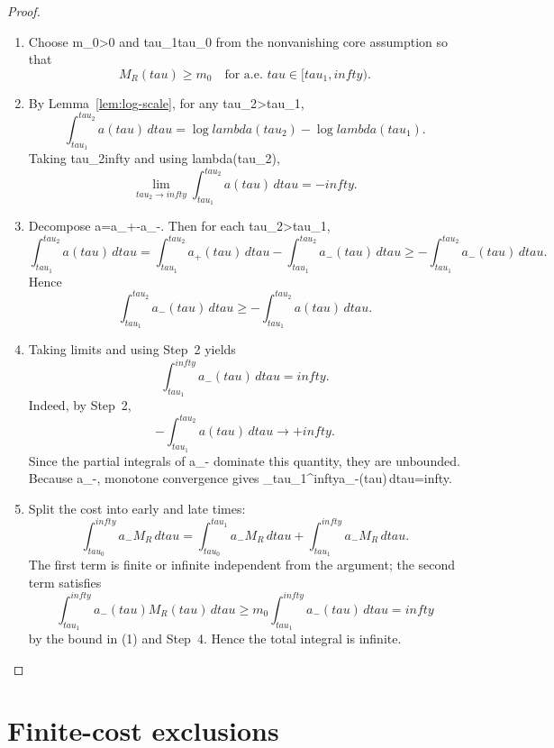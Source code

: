 \documentclass[11pt]{amsart}
\def\({}%
\def\){}%
\def\tau{tau}%
\def\lambda{lambda}%
\def\infty{infty}%
\theoremstyle{plain}
\theoremstyle{definition}
\theoremstyle{remark}
\begin{document}
\begin{proof}
\begin{enumerate}[label=(\arabic*)]
  \item Choose \(m_0>0\) and \(\tau_1\ge\tau_0\) from the nonvanishing
  core assumption so that
  \[
    M_R(\tau)\ge m_0\quad\text{for a.e. }\tau\in[\tau_1,\infty).
  \]

  \item By Lemma~\ref{lem:log-scale}, for any \(\tau_2>\tau_1\),
  \[
    \int_{\tau_1}^{\tau_2}a(\tau)
    \,d\tau
    =\log\lambda(\tau_2)-\log\lambda(\tau_1).
  \]
  Taking \(\tau_2\to\infty\) and using \(\lambda(\tau_2)\),
  \[
    \lim_{\tau_2\to\infty}\int_{\tau_1}^{\tau_2}a(\tau)
    \,d\tau=-\infty.
  \]

  \item Decompose \(a=a_+-a_-\).  Then for each \(\tau_2>\tau_1\),
  \[
    \int_{\tau_1}^{\tau_2}a(\tau)
    \,d\tau
    =\int_{\tau_1}^{\tau_2}a_+(\tau)
    \,d\tau-\int_{\tau_1}^{\tau_2}a_-(\tau)
    \,d\tau
    \ge-\int_{\tau_1}^{\tau_2}a_-(\tau)
    \,d\tau.
    \]
    Hence
    \[
    \int_{\tau_1}^{\tau_2}a_-(\tau)
    \,d\tau\ge
    -\int_{\tau_1}^{\tau_2}a(\tau)
    \,d\tau.
    \]

  \item Taking limits and using Step~2 yields
  \[
    \int_{\tau_1}^{\infty}a_-(\tau)
    \,d\tau=\infty.
  \]
  Indeed, by Step~2,
  \[
    -\int_{\tau_1}^{\tau_2}a(\tau)\,d\tau\to+\infty.
  \]
  Since the partial integrals of \(a_-\) dominate this quantity, they are unbounded.
  Because \(a_-\), monotone convergence gives
  \(\int_{\tau_1}^{\infty}a_-(\tau)\,d\tau=\infty\).

  \item Split the cost into early and late times:
  \[
    \int_{\tau_0}^{\infty}a_-M_R
    \,d\tau
    =\int_{\tau_0}^{\tau_1}a_-M_R
    \,d\tau+
    \int_{\tau_1}^{\infty}a_-M_R
    \,d\tau.
  \]
  The first term is finite or infinite independent from the argument; the second term
  satisfies
  \[
    \int_{\tau_1}^{\infty}a_-(\tau)M_R(\tau)
    \,d\tau
    \ge m_0\int_{\tau_1}^{\infty}a_-(\tau)
    \,d\tau
    =\infty
  \]
  by the bound in (1) and Step~4.  Hence the total integral is infinite.
\end{enumerate}
\end{proof}

\section{Finite-cost exclusions}
\label{sec:finite-cost}
\end{document}
